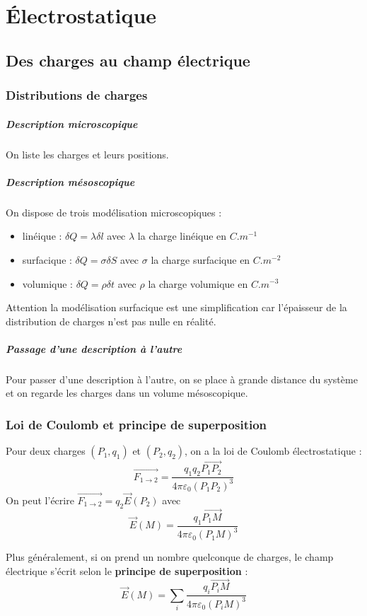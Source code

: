 \documentclass[french]{book}
\theoremstyle{plain}
\theoremstyle{definition}
\theoremstyle{remark}
\newcommand{\inv}{^{-1}}
\begin{document}
\chapter{Électrostatique}
\localtableofcontents
\section{Des charges au champ électrique}
\subsection{Distributions de charges}
\paragraph{Description microscopique}
On liste les charges et leurs positions.
\paragraph{Description mésoscopique}
On dispose de trois modélisation microscopiques :
\begin{itemize}
	\item linéique : $\delta Q=\lambda \delta l$ avec $\lambda$ la charge linéique en $C.m\inv$
	\item surfacique : $\delta Q=\sigma \delta S$ avec $\sigma$ la charge surfacique en $C.m^{-2}$
	\item volumique : $\delta Q=\rho \delta t$ avec $\rho$ la charge volumique en $C.m^{-3}$
\end{itemize}
Attention la modélisation surfacique est une simplification car l'épaisseur de la distribution de charges n'est pas nulle en réalité.
\paragraph{Passage d'une description à l'autre} Pour passer d'une description à l'autre, on se place à grande distance du système et on regarde les charges dans un volume mésoscopique.
\subsection{Loi de Coulomb et principe de superposition}
Pour deux charges $(P_1,q_1)$ et $(P_2,q_2)$, on a la loi de Coulomb électrostatique : $$\overrightarrow{F_{1\to 2}}=\frac{q_1q_2\overrightarrow{P_1P_2}}{4\pi\varepsilon_0(P_1P_2)^3}$$ On peut l'écrire $\overrightarrow{F_{1\to 2}}=q_2\overrightarrow{E}(P_2)$ avec $$\overrightarrow{E}(M)=\frac{q_1\overrightarrow{P_1M}}{4\pi\varepsilon_0(P_1M)^3}$$ \par Plus généralement, si on prend un nombre quelconque de charges, le champ électrique s'écrit selon le \textbf{principe de superposition} : $$\overrightarrow{E}(M)=\sum_i \frac{q_i\overrightarrow{P_iM}}{4\pi\varepsilon_0(P_iM)^3}$$
\end{document}

